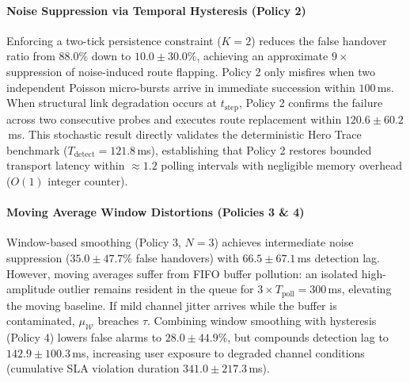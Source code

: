 \paragraph{Noise Suppression via Temporal Hysteresis (Policy 2)}
Enforcing a two-tick persistence constraint ($K=2$) reduces the false handover ratio from $88.0\%$ down to $10.0 \pm 30.0\%$, achieving an approximate $9\times$ suppression of noise-induced route flapping. Policy 2 only misfires when two independent Poisson micro-bursts arrive in immediate succession within $100$\,ms. When structural link degradation occurs at $t_{\text{step}}$, Policy 2 confirms the failure across two consecutive probes and executes route replacement within $120.6 \pm 60.2$\,ms. This stochastic result directly validates the deterministic Hero Trace benchmark ($T_{\text{detect}} = 121.8$\,ms), establishing that Policy 2 restores bounded transport latency within $\approx 1.2$ polling intervals with negligible memory overhead ($O(1)$ integer counter).

\paragraph{Moving Average Window Distortions (Policies 3 \& 4)}
Window-based smoothing (Policy 3, $N=3$) achieves intermediate noise suppression ($35.0 \pm 47.7\%$ false handovers) with $66.5 \pm 67.1$\,ms detection lag. However, moving averages suffer from FIFO buffer pollution: an isolated high-amplitude outlier remains resident in the queue for $3 \times T_{\text{poll}} = 300$\,ms, elevating the moving baseline. If mild channel jitter arrives while the buffer is contaminated, $\mu_{\mathcal{W}}$ breaches $\tau$. Combining window smoothing with hysteresis (Policy 4) lowers false alarms to $28.0 \pm 44.9\%$, but compounds detection lag to $142.9 \pm 100.3$\,ms, increasing user exposure to degraded channel conditions (cumulative SLA violation duration $341.0 \pm 217.3$\,ms).
